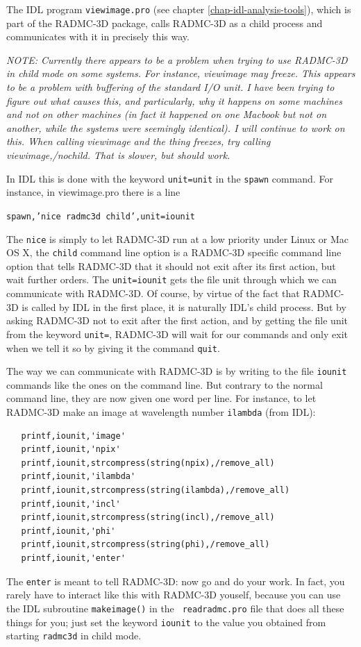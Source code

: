 \documentclass{report}
\newenvironment{asciibox}%
  {\begin{list}{}{%
    \setlength{\topsep}{0.5em}%
    \setlength{\parskip}{0em}%
    \setlength{\parsep}{0em}%
    \setlength{\itemsep}{0em}%
    \setlength{\rightmargin}{0em}%
    \setlength{\leftmargin}{3.0em}%
    \setlength{\labelsep}{1em}%
    \setlength{\labelwidth}{2em}%
  }\normalfont\footnotesize\item}
  {\end{list}}
\begin{document}
The IDL program {\small\tt viewimage.pro} (see chapter
\ref{chap-idl-analysis-tools}), which is part of the RADMC-3D package, calls
RADMC-3D as a child process and communicates with it in precisely this
way. 

{\em NOTE: Currently there appears to be a problem when trying to use
RADMC-3D in child mode on some systems. For instance, viewimage may freeze.
This appears to be a problem with buffering of the standard I/O unit.
I have been trying to figure out what causes this, and particularly, why
it happens on some machines and not on other machines (in fact it happened
on one Macbook but not on another, while the systems were seemingly
identical). I will continue to work on this. When calling viewimage and
the thing freezes, try calling viewimage,/nochild. That is slower, but
should work.}

In IDL this is done with the keyword {\small\tt unit=unit} in the
{\small\tt spawn} command. For instance, in viewimage.pro there is a line

{\small\tt spawn,'nice radmc3d child',unit=iounit}

\noindent The {\small\tt nice} is simply to let RADMC-3D run at a low priority
under Linux or Mac OS X, the {\small\tt child} command line option is a RADMC-3D
specific command line option that tells RADMC-3D that it should not exit
after its first action, but wait further orders. The {\small\tt unit=iounit} 
gets the file unit through which we can communicate with RADMC-3D. 
Of course, by virtue of the fact that RADMC-3D is called by IDL in the
first place, it is naturally IDL's child process. But by asking RADMC-3D
not to exit after the first action, and by getting the file unit
from the keyword {\small\tt unit=}, RADMC-3D will wait for our commands and
only exit when we tell it so by giving it the command {\small\tt quit}.

The way we can communicate with RADMC-3D is by writing to the file
{\small\tt iounit} commands like the ones on the command line. But contrary
to the normal command line, they are now given one word per line. 
For instance, to let RADMC-3D make an image at wavelength number
{\small\tt ilambda} (from IDL):
\begin{asciibox}\begin{verbatim}
   printf,iounit,'image'
   printf,iounit,'npix'
   printf,iounit,strcompress(string(npix),/remove_all)
   printf,iounit,'ilambda'
   printf,iounit,strcompress(string(ilambda),/remove_all)
   printf,iounit,'incl'
   printf,iounit,strcompress(string(incl),/remove_all)
   printf,iounit,'phi'
   printf,iounit,strcompress(string(phi),/remove_all)
   printf,iounit,'enter'
\end{verbatim}\end{asciibox}
The {\small\tt enter} is meant to tell RADMC-3D: now go and do your work. In
fact, you rarely have to interact like this with RADMC-3D youself, because
you can use the IDL subroutine {\small\tt makeimage()} in the {\small\tt
  readradmc.pro} file that does all these things for you; just set the
keyword {\small\tt iounit} to the value you obtained from starting 
{\small\tt radmc3d} in child mode.
\end{document}
